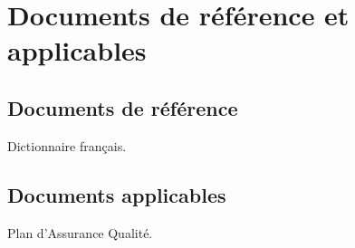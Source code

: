 
\section{Documents de référence et applicables}
    
    \subsection{Documents de référence}
        Dictionnaire français.
    \subsection{Documents applicables}
        Plan d'Assurance Qualité.

